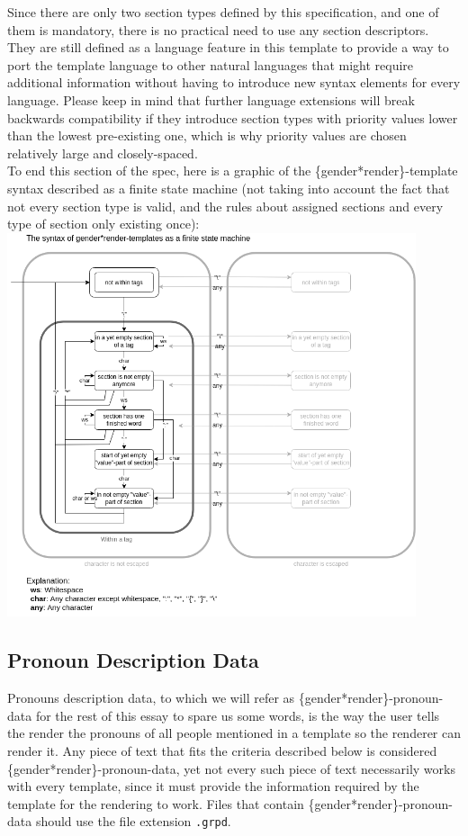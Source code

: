 \documentclass{article}
\begin{document}
    Since there are only two section types defined by this specification, and one of them is mandatory, there is no practical need to use any section descriptors.
    They are still defined as a language feature in this template to provide a way to port the template language to other natural languages that might require additional information without having to introduce new syntax elements for every language.
    Please keep in mind that further language extensions will break backwards compatibility if they introduce section types with priority values lower than the lowest pre-existing one, which is why priority values are chosen relatively large and closely-spaced.\\

    To end this section of the spec, here is a graphic of the \{gender*render\}-template syntax described as a finite state machine (not taking into account the fact that not every section type is valid, and the rules about assigned sections and every type of section only existing once):\\

    \includegraphics[width=12cm]{images/template-as-finite-state-machine.png}

    \subsection{Pronoun Description Data}

     Pronouns description data, to which we will refer as \{gender*render\}-pronoun-data for the rest of this essay to spare us some words, is the way the user tells the render the pronouns of all people mentioned in a template so the renderer can render it.
     Any piece of text that fits the criteria described below is considered \{gender*render\}-pronoun-data, yet not every such piece of text necessarily works with every template, since it must provide the information required by the template for the rendering to work.
    Files that contain \{gender*render\}-pronoun-data should use the file extension \texttt{.grpd}.\\
\end{document}
